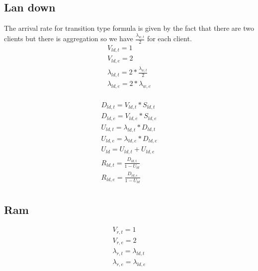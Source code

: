 \documentclass[11pt]{article}
\begin{document}
\subsection{Lan down}
The arrival rate for transition type formula is given by the fact that there are two clients but there is aggregation so we have $\frac{\lambda_{w, t}}{2}$ for each client.
\begin{equation}
    \begin{array}{l}
        V_{ld, t} = 1 \\
        V_{ld, e} = 2 \\
        \lambda_{ld, t} = 2*\frac{\lambda_{w, t}}{2} \\ %
        \lambda_{ld, e} = 2*\lambda_{w, e} \\
    \end{array}
\end{equation}

\begin{equation}
    \begin{array}{l}
        D_{ld, t} = V_{ld, t} * S_{ld, t} \\
        D_{ld, e} = V_{ld, e} * S_{ld, e} \\
        U_{ld, t} = \lambda_{ld, t} * D_{ld, t} \\
        U_{ld, e} = \lambda_{ld, e} * D_{ld, e} \\
        U_{ld} = U_{ld, t} + U_{ld, e} \\
        R_{ld, t} = \frac{D_{ld, t}}{1 - U_{ld}} \\
        R_{ld, e} = \frac{D_{ld, e}}{1 - U_{ld}} \\
    \end{array}
\end{equation}

\subsection{Ram}

\begin{equation}
    \begin{array}{l}
        V_{r, t} = 1 \\
        V_{r, e} = 2 \\ %
        \lambda_{r, t} = \lambda_{ld, t} \\
        \lambda_{r, e} = \lambda_{ld, e} \\
    \end{array}
\end{equation}
\end{document}
